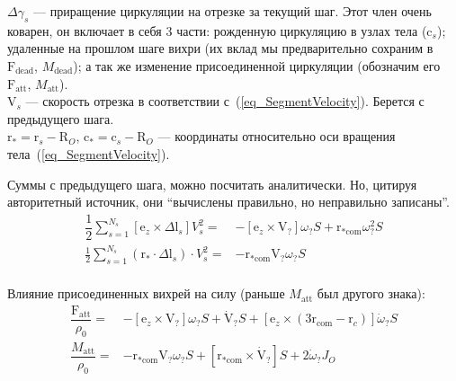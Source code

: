 \documentclass[14pt]{extreport}
\newcommand{\br}[1]{\boldsymbol{\mathrm{#1}}}
\renewcommand{\vec}[1]{\br{#1}}
\newcommand{\att}{\text{att}}
\begin{document}
$\Delta \gamma_s$ --- приращение циркуляции на отрезке за текущий шаг. Этот член очень коварен, он включает в себя 3 части: рожденную циркуляцию в узлах тела ($\vec c_s$); удаленные на прошлом шаге вихри (их вклад мы предварительно сохраним в $\vec F_\text{dead}$, $M_\text{dead}$); а так же изменение присоединенной циркуляции (обозначим его $\vec F_\att$, $M_\att$).\\
$\vec V_s$ --- скорость отрезка в соответствии с~(\ref{eq_SegmentVelocity}). Берется с предыдущего шага.\\
$\vec r_* = \vec r_s - \vec R_O$, $\vec c_* = \vec c_s - \vec R_O$ --- координаты относительно оси вращения тела~(\ref{eq_SegmentVelocity}).

Суммы с предыдущего шага, можно посчитать аналитически. Но, цитируя авторитетный источник, они ``вычислены правильно, но неправильно записаны''.
\begin{equation}
\begin{split}
\dfrac{1}{2} \sum_{s=1}^{N_s} [\vec e_z \times \Delta \vec l_s] V_s^2
=& -[\vec e_z \times \vec V_?]\omega_? S + \vec r_{*\text{com}} \omega_?^2 S \\
\frac{1}{2} \sum_{s=1}^{N_s} (\vec r_* \cdot \Delta \vec l_s) \cdot V_s^2
=& - \vec r_{*\text{com}} \vec V_? \omega_? S\\
\end{split}
\end{equation}

Влияние присоединенных вихрей на силу (раньше $M_\text{att}$ был другого знака):
\begin{equation}
\begin{split}
\dfrac{\vec F_\att}{\rho_0} =&
-[\vec e_z \times \vec V_?]\omega_? S
+ \dot{\vec{V}}_? S
+ [\vec e_z \times (3 \vec r_\text{com} - \vec r_c)] \dot{\omega}_? S \\
\dfrac{M_\att}{\rho_0} =&
- \vec r_{*\text{com}} \vec V_? \omega_? S
+ [\vec r_{*\text{com}} \times \dot{\vec{V}}_?] S
+ 2 \dot{\omega}_? J_O \\
\end{split}
\end{equation}
\end{document}
